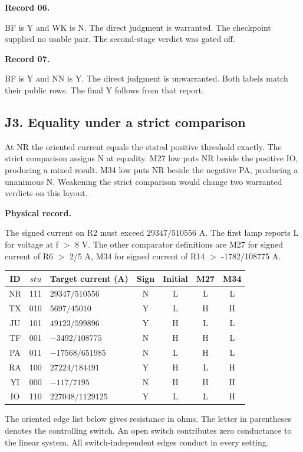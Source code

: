 \documentclass[12pt,letterpaper]{article}
\newcommand{\reading}[2]{\par\smallskip\textsf{\color{accent}\bfseries #1}\enspace #2\par}
\begin{document}
\reading{Record 06.}{} BF is Y and WK is N. The direct judgment is warranted. The checkpoint supplied no usable pair. The second-stage verdict was gated off.

\reading{Record 07.}{} BF is Y and NN is Y. The direct judgment is unwarranted. Both labels match their public rows. The final Y follows from that report.

\clearpage\subsection*{J3. Equality under a strict comparison}

At NR the oriented current equals the stated positive threshold exactly. The strict comparison assigns N at equality. M27 low puts NR beside the positive IO, producing a mixed result. M34 low puts NR beside the negative PA, producing a unanimous N. Weakening the strict comparison would change two warranted verdicts on this layout.

\reading{Physical record.}{} The signed current on R2 must exceed $29347/510556$ A. The first lamp reports L for voltage at f $>$ 8 V. The other comparator definitions are M27 for signed current of R6 $>$ 2/5 A, M34 for signed current of R14 $>$ -1782/108775 A.

\begin{center}{\small\setlength{\tabcolsep}{4pt}\begin{tabularx}{\linewidth}{@{}ccYcccc@{}}\toprule
ID & $stu$ & Target current (A) & Sign & Initial & M27 & M34\\ \midrule
NR & 111 & $29347/510556$ & N & L & L & L\\
TX & 010 & $5697/45010$ & Y & L & H & H\\
JU & 101 & $49123/599896$ & Y & H & L & L\\
TF & 001 & $-3492/108775$ & N & H & H & L\\
PA & 011 & $-17568/651985$ & N & L & H & L\\
RA & 100 & $27224/184491$ & Y & H & L & H\\
YI & 000 & $-117/7195$ & N & H & H & H\\
IO & 110 & $227048/1129125$ & Y & L & L & H\\
\bottomrule\end{tabularx}}\end{center}

The oriented edge list below gives resistance in ohms. The letter in parentheses denotes the controlling switch. An open switch contributes zero conductance to the linear system. All switch-independent edges conduct in every setting.
\end{document}
